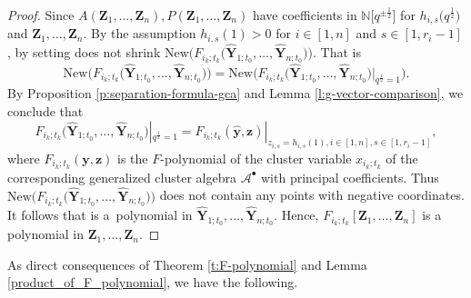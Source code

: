 \documentclass[pdftex]{sigma}
\numberwithin{equation}{section}
\begin{document}
\begin{proof}
 Since $A(\mathbf{Z}_{1},\dots,\mathbf{Z}_{n}),P(\mathbf{Z}_{1},\dots,\mathbf{Z}_{n})$ have coefficients in $\mathbb{N}\big[q^{\pm\frac{1}{2}}\big]$ for $h_{i,s}\bigl(q^{\frac{1}{2}}\bigr)$ and $\mathbf{Z}_{1},\dots,\mathbf{Z}_{n}$. By the assumption $h_{i,s}(1)>0$ for $i\in[1,n]$ and $s\in[1,r_{i}-1]$, by setting  does not shrink $\text{New}\bigl(F_{i_{k};t_{k}}\bigl(\mathbf{\hat{Y}}_{1;t_{0}},\dots,\mathbf{\hat{Y}}_{n;t_{0}}\bigr)\bigr)$. That is
 \[
 \text{New}\bigl(F_{i_{k};t_{k}}\bigl(\mathbf{\hat{Y}}_{1;t_{0}},\dots,\mathbf{\hat{Y}}_{n;t_{0}}\bigr)\bigr)
 =\text{New}\bigl(F_{i_{k};t_{k}}\bigl(\mathbf{\hat{Y}}_{1;t_{0}},\dots,\mathbf{\hat{Y}}_{n;t_{0}}\bigr)|_{q^{\frac{1}{2}}=1}\bigr).\]
By Proposition \ref{p:separation-formula-gca} and Lemma \ref{l:g-vector-comparison}, we conclude that \[F_{i_{k};t_{k}}\bigl(\mathbf{\hat{Y}}_{1;t_{0}},\dots,\mathbf{\hat{Y}}_{n;t_{0}}\bigr)|_{q^{\frac{1}{2}}=1}=F_{i_k;t_k}(\mathbf{\hat{y}},\mathbf{z})|_{z_{i,s}=h_{i,s}(1),i\in [1,n],s\in [1,r_i-1]},\] where $F_{i_k;t_k}(\mathbf{y},\mathbf{z})$ is the $F$-polynomial of the cluster variable $x_{i_k;t_k}$ of the corresponding generalized cluster algebra $\mathcal{A}^\bullet$ with principal coefficients.
 Thus $\text{New}\bigl(F_{i_{k};t_{k}}\bigl(\mathbf{\hat{Y}}_{1;t_{0}},\dots,\mathbf{\hat{Y}}_{n;t_{0}}\bigr)\bigr)$ does not contain any points with negative coordinates. It follows that  is a~polynomial in $\mathbf{\hat{Y}}_{1;t_{0}},\dots,\mathbf{\hat{Y}}_{n;t_{0}}$. Hence, $F_{i_{k};t_{k}}[\mathbf{Z}_1,\dots,\mathbf{Z}_{n}]$ is a polynomial in $\mathbf{Z}_{1},\dots,\mathbf{Z}_{n}$.
\end{proof}

As direct consequences of Theorem \ref{t:F-polynomial} and Lemma \ref{product_of_F_polynomial}, we have the following.
\end{document}
